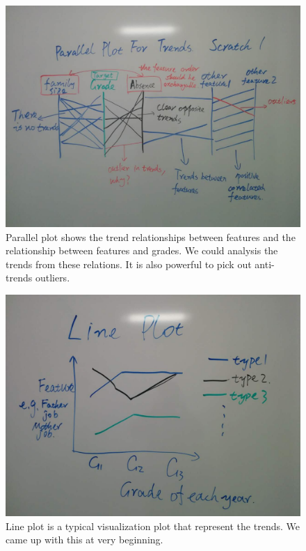 \documentclass{article}
\begin{document}
\begin{figure}[H]
\centering
\includegraphics[scale=0.25]{parallel_plot.jpg}
\caption{Parallel plot shows the trend relationships between features and the relationship between features and grades. We could analysis the trends from these relations. It is also powerful to pick out anti-trends outliers.}
\end{figure}

\begin{figure}[H]
\centering
\includegraphics[scale=0.25]{line_plot.jpg}
\caption{Line plot is a typical visualization plot that represent the trends. We came up with this at very beginning.}
\end{figure}
\end{document}
